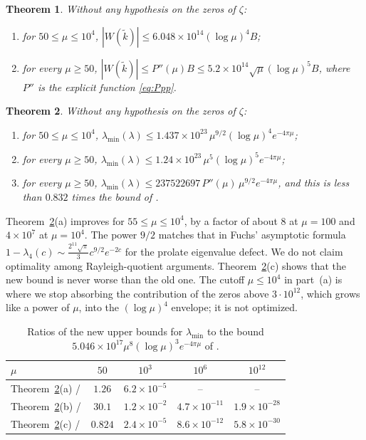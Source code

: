 \documentclass[11pt]{amsart}
\newtheorem{theorem}{Theorem}
\theoremstyle{remark}
\numberwithin{equation}{section}
\begin{document}
\begin{theorem}\label{thm:F}
Without any hypothesis on the zeros of $\zeta$:
\begin{enumerate}
\item[(a)] for $50\le\mu\le10^4$, $|W(\tilde k)|\le6.048\times10^{14}(\log\mu)^4B$;
\item[(b)] for every $\mu\ge50$, $|W(\tilde k)|\le P''(\mu)B\le5.2\times10^{14}\sqrt\mu(\log\mu)^5B$, where $P''$ is the explicit function \eqref{eq:Ppp}.
\end{enumerate}
\end{theorem}

\begin{theorem}\label{thm:G}
Without any hypothesis on the zeros of $\zeta$:
\begin{enumerate}
\item[(a)] for $50\le\mu\le10^4$, $\lambda_{\min}(\lambda)\le1.437\times10^{23}\,\mu^{9/2}(\log\mu)^4e^{-4\pi\mu}$;
\item[(b)] for every $\mu\ge50$, $\lambda_{\min}(\lambda)\le1.24\times10^{23}\,\mu^5(\log\mu)^5e^{-4\pi\mu}$;
\item[(c)] for every $\mu\ge50$, $\lambda_{\min}(\lambda)\le237522697\,P''(\mu)\,\mu^{9/2}e^{-4\pi\mu}$, and this is less than $0.832$ times the bound of \cite[Thm.~E]{MoriWeilII}.
\end{enumerate}
\end{theorem}

Theorem~\ref{thm:G}(a) improves \cite[Thm.~E]{MoriWeilII} for $55\le\mu\le10^4$, by a factor of about $8$ at $\mu=100$ and $4\times10^7$ at $\mu=10^4$. The power $9/2$ matches that in Fuchs' asymptotic formula $1-\lambda_4(c)\sim\frac{2^{11}\sqrt\pi}{3}c^{9/2}e^{-2c}$ \cite{Fuchs64} for the prolate eigenvalue defect. We do not claim optimality among Rayleigh-quotient arguments. Theorem~\ref{thm:G}(c) shows that the new bound is never worse than the old one. The cutoff $\mu\le10^4$ in part~(a) is where we stop absorbing the contribution of the zeros above $3\cdot10^{12}$, which grows like a power of $\mu$, into the $(\log\mu)^4$ envelope; it is not optimized.

\begin{table}[h]
\centering
\begin{tabular}{lcccc}
\toprule
$\mu$ & $50$ & $10^3$ & $10^6$ & $10^{12}$\\
\midrule
Theorem~\ref{thm:G}(a) / \cite[Thm.~E]{MoriWeilII} & $1.26$ & $6.2\times10^{-5}$ & -- & --\\
Theorem~\ref{thm:G}(b) / \cite[Thm.~E]{MoriWeilII} & $30.1$ & $1.2\times10^{-2}$ & $4.7\times10^{-11}$ & $1.9\times10^{-28}$\\
Theorem~\ref{thm:G}(c) / \cite[Thm.~E]{MoriWeilII} & $0.824$ & $2.4\times10^{-5}$ & $8.6\times10^{-12}$ & $5.8\times10^{-30}$\\
\bottomrule
\end{tabular}
\caption{Ratios of the new upper bounds for $\lambda_{\min}$ to the bound $5.046\times10^{17}\mu^8(\log\mu)^3e^{-4\pi\mu}$ of \cite[Thm.~E]{MoriWeilII}.}\label{tab:compare}
\end{table}
\end{document}
